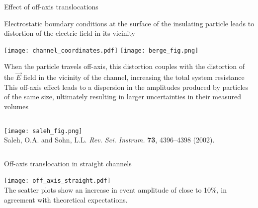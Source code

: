 \begin{frame}[c]{Effect of off-axis translocations}
	
	{\scriptsize
		Electrostatic boundary conditions at the surface of the insulating particle leads to distortion of the electric field in its vicinity \\
		\vspace{.1in}
		{\centering
			\texttt{[image: channel\_coordinates.pdf]}
			\hspace{.4in}
			\texttt{[image: berge\_fig.png]} \\ 
			\par
		}
		
		\vspace{.1in}
		When the particle travels off-axis, this distortion couples with the distortion of the $\vec{E}$ field in the vicinity of the channel, increasing the total system resistance \\
		\vspace{.1in}
		This off-axis effect leads to a dispersion in the amplitudes produced by particles of the same size, ultimately resulting in larger uncertainties in their measured volumes \\
		\vspace{.025in}
		\begin{columns}[t]
			\begin{column}[T]{1.75in}
				\texttt{[image: saleh\_fig.png]} \\
				{\tiny Saleh, O.A. and Sohn, L.L. \textit{Rev. Sci. Instrum.} \textbf{73}, 4396--4398 (2002).} \\ 
				\par
			\end{column}
		\end{columns}

		
	}
	
\end{frame}





\begin{frame}[c]{Off-axis translocation in straight channels}
	
	{\centering
		\texttt{[image: off\_axis\_straight.pdf]} \\
		{\scriptsize \textcolor{negativered}{The scatter plots show an increase in event amplitude of close to 10\%, in agreement with theoretical expectations.} } \\
		\par
	}
	
\end{frame}



